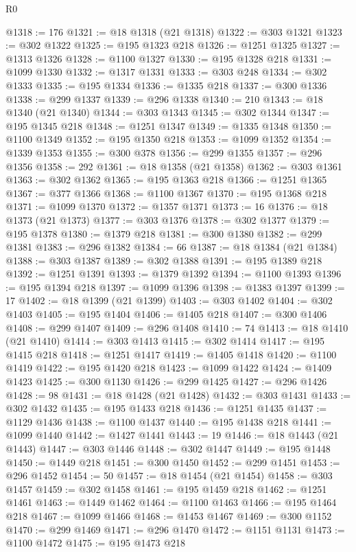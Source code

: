 \begin{lexlean}{R0}
\begin{coremodule}
@1318 := 176
@1321 := @18 @1318 (@21 @1318)
@1322 := @303 @1321
@1323 := @302 @1322
@1325 := @195 @1323 @218
@1326 := @1251 @1325
@1327 := @1313 @1326
@1328 := @1100 @1327
@1330 := @195 @1328 @218
@1331 := @1099 @1330
@1332 := @1317 @1331
@1333 := @303 @248
@1334 := @302 @1333
@1335 := @195 @1334
@1336 := @1335 @218
@1337 := @300 @1336
@1338 := @299 @1337
@1339 := @296 @1338
@1340 := 210
@1343 := @18 @1340 (@21 @1340)
@1344 := @303 @1343
@1345 := @302 @1344
@1347 := @195 @1345 @218
@1348 := @1251 @1347
@1349 := @1335 @1348
@1350 := @1100 @1349
@1352 := @195 @1350 @218
@1353 := @1099 @1352
@1354 := @1339 @1353
@1355 := @300 @378
@1356 := @299 @1355
@1357 := @296 @1356
@1358 := 292
@1361 := @18 @1358 (@21 @1358)
@1362 := @303 @1361
@1363 := @302 @1362
@1365 := @195 @1363 @218
@1366 := @1251 @1365
@1367 := @377 @1366
@1368 := @1100 @1367
@1370 := @195 @1368 @218
@1371 := @1099 @1370
@1372 := @1357 @1371
@1373 := 16
@1376 := @18 @1373 (@21 @1373)
@1377 := @303 @1376
@1378 := @302 @1377
@1379 := @195 @1378
@1380 := @1379 @218
@1381 := @300 @1380
@1382 := @299 @1381
@1383 := @296 @1382
@1384 := 66
@1387 := @18 @1384 (@21 @1384)
@1388 := @303 @1387
@1389 := @302 @1388
@1391 := @195 @1389 @218
@1392 := @1251 @1391
@1393 := @1379 @1392
@1394 := @1100 @1393
@1396 := @195 @1394 @218
@1397 := @1099 @1396
@1398 := @1383 @1397
@1399 := 17
@1402 := @18 @1399 (@21 @1399)
@1403 := @303 @1402
@1404 := @302 @1403
@1405 := @195 @1404
@1406 := @1405 @218
@1407 := @300 @1406
@1408 := @299 @1407
@1409 := @296 @1408
@1410 := 74
@1413 := @18 @1410 (@21 @1410)
@1414 := @303 @1413
@1415 := @302 @1414
@1417 := @195 @1415 @218
@1418 := @1251 @1417
@1419 := @1405 @1418
@1420 := @1100 @1419
@1422 := @195 @1420 @218
@1423 := @1099 @1422
@1424 := @1409 @1423
@1425 := @300 @1130
@1426 := @299 @1425
@1427 := @296 @1426
@1428 := 98
@1431 := @18 @1428 (@21 @1428)
@1432 := @303 @1431
@1433 := @302 @1432
@1435 := @195 @1433 @218
@1436 := @1251 @1435
@1437 := @1129 @1436
@1438 := @1100 @1437
@1440 := @195 @1438 @218
@1441 := @1099 @1440
@1442 := @1427 @1441
@1443 := 19
@1446 := @18 @1443 (@21 @1443)
@1447 := @303 @1446
@1448 := @302 @1447
@1449 := @195 @1448
@1450 := @1449 @218
@1451 := @300 @1450
@1452 := @299 @1451
@1453 := @296 @1452
@1454 := 50
@1457 := @18 @1454 (@21 @1454)
@1458 := @303 @1457
@1459 := @302 @1458
@1461 := @195 @1459 @218
@1462 := @1251 @1461
@1463 := @1449 @1462
@1464 := @1100 @1463
@1466 := @195 @1464 @218
@1467 := @1099 @1466
@1468 := @1453 @1467
@1469 := @300 @1152
@1470 := @299 @1469
@1471 := @296 @1470
@1472 := @1151 @1131
@1473 := @1100 @1472
@1475 := @195 @1473 @218

\end{coremodule}
\end{lexlean}
